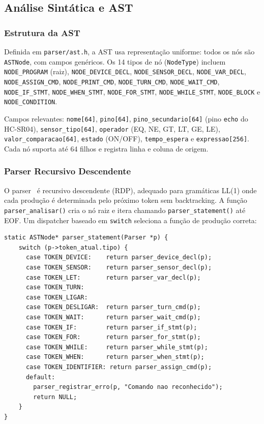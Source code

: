 \documentclass[conference]{IEEEtran}
\begin{document}
\subsection{Análise Sintática e AST}

\subsubsection{Estrutura da AST}
Definida em \texttt{parser/ast.h}, a AST usa representação uniforme: todos
os nós são \texttt{ASTNode}, com campos genéricos. Os 14 tipos de nó
(\texttt{NodeType}) incluem \texttt{NODE\_PROGRAM} (raiz),
\texttt{NODE\_DEVICE\_DECL}, \texttt{NODE\_SENSOR\_DECL},
\texttt{NODE\_VAR\_DECL}, \texttt{NODE\_ASSIGN\_CMD},
\texttt{NODE\_PRINT\_CMD}, \texttt{NODE\_TURN\_CMD},
\texttt{NODE\_WAIT\_CMD}, \texttt{NODE\_IF\_STMT},
\texttt{NODE\_WHEN\_STMT}, \texttt{NODE\_FOR\_STMT},
\texttt{NODE\_WHILE\_STMT}, \texttt{NODE\_BLOCK} e
\texttt{NODE\_CONDITION}.

Campos relevantes: \texttt{nome[64]}, \texttt{pino[64]},
\texttt{pino\_secundario[64]} (pino \texttt{echo} do HC-SR04),
\texttt{sensor\_tipo[64]}, \texttt{operador} (EQ, NE, GT, LT, GE, LE),
\texttt{valor\_comparacao[64]}, \texttt{estado} (ON/OFF),
\texttt{tempo\_espera} e \texttt{expressao[256]}. Cada nó suporta até 64
filhos e registra linha e coluna de origem.

\subsubsection{Parser Recursivo Descendente}
O parser~\cite{aho2006,wirth1976} é recursivo descendente (RDP), adequado
para gramáticas LL(1) onde cada produção é determinada pelo próximo token
sem backtracking. A função \texttt{parser\_analisar()} cria o nó raiz e
itera chamando \texttt{parser\_statement()} até EOF. Um dispatcher baseado
em \texttt{switch} seleciona a função de produção correta:

\begin{lstlisting}[style=csmall,caption={Dispatcher do parser.},label={lst:parser}]
static ASTNode* parser_statement(Parser *p) {
    switch (p->token_atual.tipo) {
      case TOKEN_DEVICE:    return parser_device_decl(p);
      case TOKEN_SENSOR:    return parser_sensor_decl(p);
      case TOKEN_LET:       return parser_var_decl(p);
      case TOKEN_TURN:
      case TOKEN_LIGAR:
      case TOKEN_DESLIGAR:  return parser_turn_cmd(p);
      case TOKEN_WAIT:      return parser_wait_cmd(p);
      case TOKEN_IF:        return parser_if_stmt(p);
      case TOKEN_FOR:       return parser_for_stmt(p);
      case TOKEN_WHILE:     return parser_while_stmt(p);
      case TOKEN_WHEN:      return parser_when_stmt(p);
      case TOKEN_IDENTIFIER: return parser_assign_cmd(p);
      default:
        parser_registrar_erro(p, "Comando nao reconhecido");
        return NULL;
    }
}
\end{lstlisting}
\end{document}
